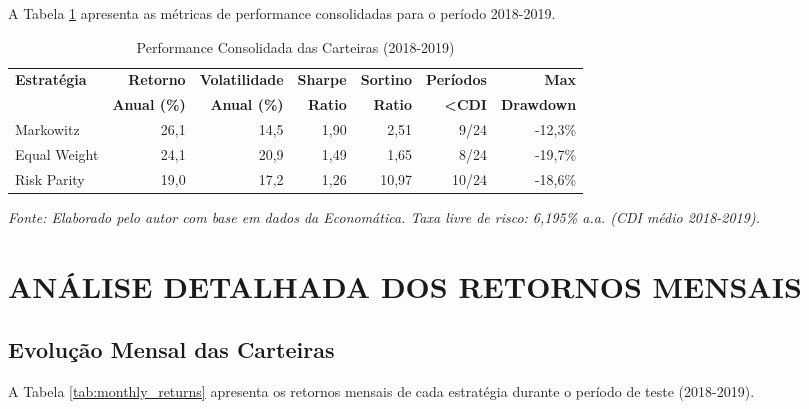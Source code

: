 A Tabela \ref{tab:portfolio_performance} apresenta as métricas de performance consolidadas para o período 2018-2019.

\begin{table}[H]
\centering
\caption{Performance Consolidada das Carteiras (2018-2019)}
\scriptsize
\begin{tabular}{|l|r|r|r|r|r|r|}
\hline
\textbf{Estratégia} & \textbf{Retorno} & \textbf{Volatilidade} & \textbf{Sharpe} & \textbf{Sortino} & \textbf{Períodos} & \textbf{Max} \\
& \textbf{Anual (\%)} & \textbf{Anual (\%)} & \textbf{Ratio} & \textbf{Ratio} & \textbf{<CDI} & \textbf{Drawdown} \\
\hline
Markowitz & 26,1 & 14,5 & 1,90 & 2,51 & 9/24 & -12,3\% \\
\hline
Equal Weight & 24,1 & 20,9 & 1,49 & 1,65 & 8/24 & -19,7\% \\
\hline
Risk Parity & 19,0 & 17,2 & 1,26 & 10,97 & 10/24 & -18,6\% \\
\hline
\end{tabular}
\normalsize
\textit{Fonte: Elaborado pelo autor com base em dados da Economática. Taxa livre de risco: 6,195\% a.a. (CDI médio 2018-2019).}
\label{tab:portfolio_performance}
\end{table}

\section{ANÁLISE DETALHADA DOS RETORNOS MENSAIS}

\subsection{Evolução Mensal das Carteiras}

A Tabela \ref{tab:monthly_returns} apresenta os retornos mensais de cada estratégia durante o período de teste (2018-2019).

